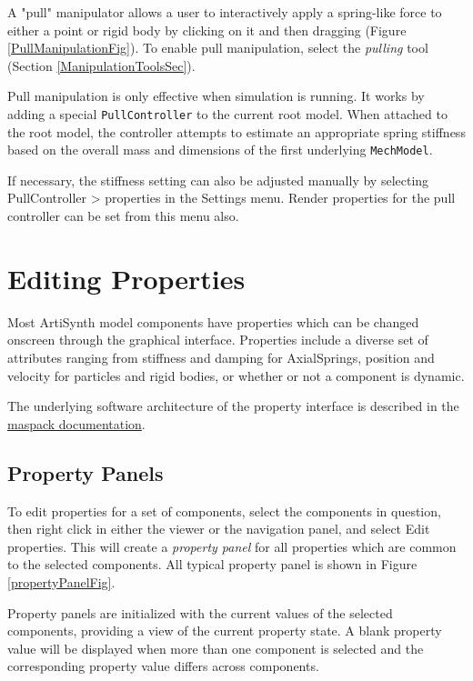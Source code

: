 \documentclass{article}
\begin{document}
A "pull" manipulator allows a user to interactively apply a
spring-like force to either a point or rigid body by clicking on it
and then dragging (Figure \ref{PullManipulationFig}). To enable pull
manipulation, select the {\it pulling} tool (Section
\ref{ManipulationToolsSec}).

Pull manipulation is only effective when simulation is running.  It
works by adding a special {\tt PullController} to the current root
model. When attached to the root model, the controller attempts to
estimate an appropriate spring stiffness based on the overall mass and
dimensions of the first underlying {\tt MechModel}.

If necessary, the stiffness setting can also be adjusted manually by
selecting {\sf PullController > properties} in the {\sf Settings}
menu.  Render properties for the pull controller can be set from this
menu also.

\section{Editing Properties}

Most ArtiSynth model components have properties which can be 
changed onscreen through the graphical interface. Properties
include a diverse set of attributes ranging from stiffness and
damping for AxialSprings, position and velocity for particles and
rigid bodies, or whether or not a component is dynamic.

The underlying software architecture of the property interface is 
described in the 
\href{../maspack/maspack.html#Properties}{maspack documentation}.

\subsection{Property Panels}
\label{propertyPanelsSec}

To edit properties for a set of components, select the components in
question, then right click in either the viewer or the navigation
panel, and select {\sf Edit properties}. This will create a {\it property
panel} for all properties which are common to the selected components.
All typical property panel is shown in Figure \ref{propertyPanelFig}.

Property panels are initialized with the current values of the selected
components, providing a view of the current property state. A blank
property value will be displayed when more than one component is selected and 
the corresponding property value differs across components.
\end{document}
